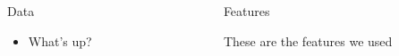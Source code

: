 \documentclass[final, 14pt]{beamer}
\newlength{\sepwid}
\newlength{\onecolwid}
\newlength{\twocolwid}
\begin{document}
\begin{frame}[t]
\begin{columns}[t]
\begin{column}{\onecolwid}

\begin{block}{Data}

\begin{itemize}

  \item What's up?

\end{itemize}

\end{block}

\end{column} %



\begin{column}{\sepwid}\end{column} %

\begin{column}{\twocolwid} %

\begin{columns}[t,totalwidth=\twocolwid] %

\begin{column}{\onecolwid}\vspace{-.6in} %


\begin{block}{Features}

  These are the features we used 

\end{block}


\end{column} %

\begin{column}{\onecolwid}\vspace{-.6in} %


\end{column}
\end{columns}
\end{column}
\end{columns}
\end{frame}
\end{document}
